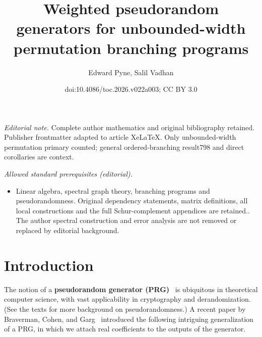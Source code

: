 \documentclass[11pt]{article}
\title{Weighted pseudorandom generators for unbounded-width permutation branching programs}
\author{Edward Pyne, Salil Vadhan}
\date{doi:10.4086/toc.2026.v022a003; CC BY 3.0}
\begin{document}
\maketitle
\noindent\textit{Editorial note.} Complete author mathematics and original bibliography retained. Publisher frontmatter adapted to article XeLaTeX. Only unbounded-width permutation primary counted; general ordered-branching result798 and direct corollaries are context.\par\medskip
\noindent\textit{Allowed standard prerequisites (editorial).}\begin{itemize}
\item Linear algebra, spectral graph theory, branching programs and pseudorandomness. Original dependency statements, matrix definitions, all local constructions and the full Schur-complement appendices are retained.. The author spectral construction and error analysis are not removed or replaced by editorial background.
\end{itemize}\medskip
\section{Introduction}

The notion of a \textbf{pseudorandom generator (PRG)}~\cite{BlumMi84,Yao82,Nisan91,NisanWi94} is ubiquitous in theoretical computer science, with vast applicability in cryptography and derandomization.  (See the texts \cite{Goldreich10-prgprimer,vadhan2012pseudorandomness} for more background on pseudorandomness.)
A recent %
paper by %
Braverman, Cohen, and Garg~\cite{BravermanCoGa18} introduced the following intriguing generalization of a PRG, in which we attach real coefficients to the outputs of the generator. %
\end{document}
